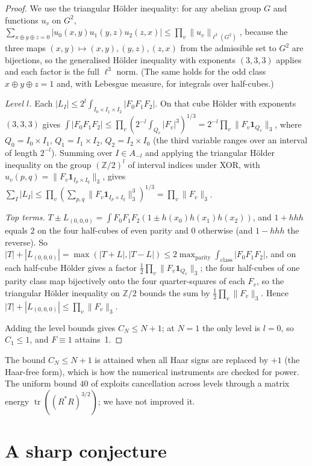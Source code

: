 \documentclass[11pt]{article}
\theoremstyle{remark}
\newcommand{\Z}{\mathbb{Z}}
\DeclareMathOperator{\tr}{tr}
\begin{document}
\begin{proof}
We use the triangular H\"older inequality: for any abelian group $G$ and functions $u_v$ on $G^2$,
$\sum_{x\oplus y\oplus z=0}|u_0(x,y)u_1(y,z)u_2(z,x)|\le\prod_v\|u_v\|_{\ell^3(G^2)}$, because the three maps
$(x,y)\mapsto(x,y),(y,z),(z,x)$ from the admissible set to $G^2$ are bijections, so the generalised H\"older inequality
with exponents $(3,3,3)$ applies and each factor is the full $\ell^3$ norm. (The same holds for the odd class
$x\oplus y\oplus z=1$ and, with Lebesgue measure, for integrals over half-cubes.)

\emph{Level $l$.} Each $|L_I|\le2^{l}\int_{I_0\times I_1\times I_2}|F_0F_1F_2|$. On that cube H\"older with exponents
$(3,3,3)$ gives $\int|F_0F_1F_2|\le\prod_v(2^{-l}\int_{Q_v}|F_v|^3)^{1/3}=2^{-l}\prod_v\|F_v\mathbf 1_{Q_v}\|_3$,
where $Q_0=I_0\times I_1$, $Q_1=I_1\times I_2$, $Q_2=I_2\times I_0$ (the third variable ranges over an interval of
length $2^{-l}$). Summing over $I\in A_{-l}$ and applying the triangular H\"older inequality on the group
$(\Z/2)^l$ of interval indices under XOR, with $u_v(p,q)=\|F_v\mathbf 1_{I_p\times I_q}\|_3$, gives
$\sum_I|L_I|\le\prod_v(\sum_{p,q}\|F_v\mathbf 1_{I_p\times I_q}\|_3^3)^{1/3}=\prod_v\|F_v\|_3$.

\emph{Top terms.} $T\pm L_{(0,0,0)}=\int F_0F_1F_2(1\pm h(x_0)h(x_1)h(x_2))$, and $1+hhh$ equals $2$ on the four
half-cubes of even parity and $0$ otherwise (and $1-hhh$ the reverse). So
$|T|+|L_{(0,0,0)}|=\max(|T+L|,|T-L|)\le2\max_{\text{parity}}\int_{\text{class}}|F_0F_1F_2|$, and on each half-cube
H\"older gives a factor $\tfrac12\prod_v\|F_v\mathbf 1_{Q_v}\|_3$; the four half-cubes of one parity class map
bijectively onto the four quarter-squares of each $F_v$, so the triangular H\"older inequality on $\Z/2$ bounds the sum
by $\tfrac12\prod_v\|F_v\|_3$. Hence $|T|+|L_{(0,0,0)}|\le\prod_v\|F_v\|_3$.

Adding the level bounds gives $C_N\le N+1$; at $N=1$ the only level is $l=0$, so $C_1\le1$, and $F\equiv1$ attains~1.
\end{proof}

The bound $C_N\le N+1$ is attained when all Haar signs are replaced by $+1$ (the Haar-free form), which is how the
numerical instruments are checked for power. The uniform bound $40$ of \cite{oai2026dyadic} exploits cancellation across
levels through a matrix energy $\tr((R^\ast R)^{3/2})$; we have not improved it.

\section{A sharp conjecture}
\end{document}
